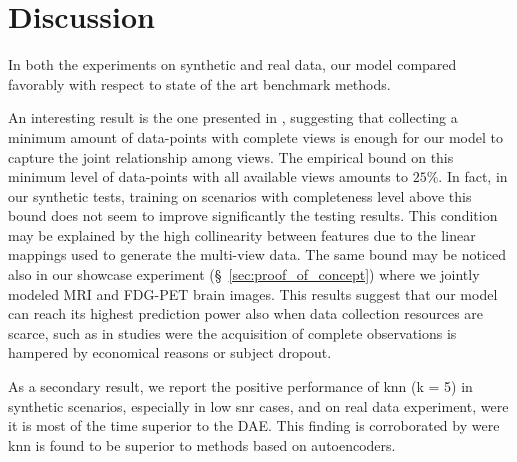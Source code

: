 \section{Discussion}

In both the experiments on synthetic and real data, our model compared favorably with respect to state of the art benchmark methods.

An interesting result is the one presented in , suggesting that collecting a minimum amount of data-points with complete views is enough for our model to capture the joint relationship among views.
The empirical bound on this minimum level of data-points with all available views amounts to $25\%$.
In fact, in our synthetic tests, training on scenarios with completeness level above this bound does not seem to improve significantly the testing results.
This condition may be explained by the high collinearity between features due to the linear mappings used to generate the multi-view data.
The same bound may be noticed also in our showcase experiment (\S~\ref{sec:proof_of_concept}) where we jointly modeled MRI and FDG-PET brain images.
This results suggest that our model can reach its highest prediction power also when data collection resources are scarce,
such as in studies were the acquisition of complete observations is hampered by economical reasons or subject dropout.

	As a secondary result, we report the positive performance of knn (k = 5) in synthetic scenarios, especially in low snr cases, and on real data experiment, were it is most of the time superior to the DAE.
	This finding is corroborated by \cite{Platias2020} were knn is found to be superior to methods based on autoencoders.

